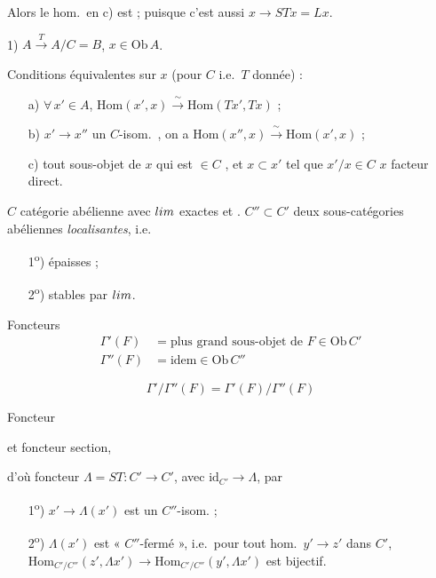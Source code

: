 \documentclass[11pt,a4paper]{article}
\begin{document}
Alors le hom.\ en c) est  ; \ill{} puisque c'est aussi
$x \to STx = Lx$.

1) \quad $A \xrightarrow{\ T\ } A/C = B$, \quad $x \in \mathrm{Ob}\, A$.

Conditions équivalentes sur $x$ (pour $C$ i.e.\ $T$ donnée) :
\begin{enumerate}
\item[a)] $\forall\, x' \in A$, \quad
      $\mathrm{Hom}(x', x) \xrightarrow{\ \sim\ } \mathrm{Hom}(Tx', Tx)$ ;
\item[b)] $x' \to x''$ un $C$-isom.\ \ill{}, on a
      $\mathrm{Hom}(x'', x) \xrightarrow{\ \sim\ } \mathrm{Hom}(x', x)$ ;
\item[c)] tout sous-objet de $x$ qui est $\in C$ \ill{}, et \ill{}
      $x \subset x'$ tel que $x'/x \in C$ \ill{} $x$ \ill{} facteur direct.
\end{enumerate}
\marginal{\ill{}}

$C$ catégorie abélienne avec $\varinjlim$ exactes et
. $C'' \subset C'$ deux sous-catégories abéliennes
\emph{localisantes}, i.e.
\begin{enumerate}
\item[1\textsuperscript{o})] épaisses ;
\item[2\textsuperscript{o})] stables par $\varinjlim$.
\end{enumerate}

Foncteurs
\begin{align*}
  \Gamma'(F) &= \text{plus grand sous-objet de } F \in \mathrm{Ob}\, C' \\
  \Gamma''(F) &= \text{idem} \in \mathrm{Ob}\, C''
\end{align*}

\[
  \Gamma'/\Gamma''(F) = \Gamma'(F)/\Gamma''(F)
\]

Foncteur \quad
{}
\quad et foncteur section,

d'où foncteur $\Lambda = ST : C' \to C'$, avec
$\mathrm{id}_{C'} \to \Lambda$,  par
\begin{enumerate}
\item[1\textsuperscript{o})] $x' \to \Lambda(x')$ est un $C''$-isom. ;
\item[2\textsuperscript{o})] $\Lambda(x')$ est « $C''$-fermé », i.e.\ pour tout
      hom.\ $y' \to z'$ dans $C'$,
      $\mathrm{Hom}_{C'/C''}(z', \Lambda x') \to
       \mathrm{Hom}_{C'/C''}(y', \Lambda x')$ est bijectif.
\end{enumerate}
\end{document}
